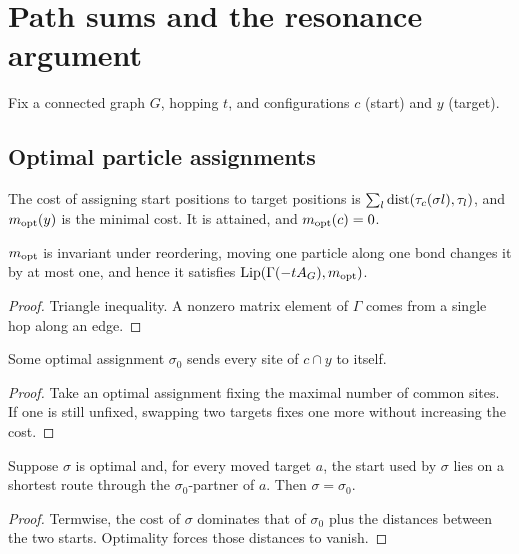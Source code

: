 \chapter{Path sums and the resonance argument}
\label{chap:pathsum}

Fix a connected graph $G$, hopping $t$, and configurations $c$ (start) and $y$ (target).

\section{Optimal particle assignments}

\begin{definition}
  \label{def:mopt}
  \leanok
  The cost of assigning start positions to target positions is $\sum_l\operatorname{dist}(\tau_c(\sigma l),\tau_l)$, and
  $m_{\mathrm{opt}}(y)$ is the minimal cost. It is attained, and $m_{\mathrm{opt}}(c)=0$.
\end{definition}

\begin{theorem}
  \label{thm:lip_mopt}
  \leanok
  $m_{\mathrm{opt}}$ is invariant under reordering, moving one particle along one bond changes it by at most one, and
  hence it satisfies $\mathrm{Lip}(\Gamma(-tA_G),m_{\mathrm{opt}})$.
\end{theorem}
\begin{proof}
  \leanok
  Triangle inequality. A nonzero matrix element of $\Gamma$ comes from a single hop along an edge.
\end{proof}

\begin{theorem}
  \label{thm:exists_opt_fixing}
  \leanok
  Some optimal assignment $\sigma_0$ sends every site of $c\cap y$ to itself.
\end{theorem}
\begin{proof}
  \leanok
  Take an optimal assignment fixing the maximal number of common sites. If one is still unfixed, swapping
  two targets fixes one more without increasing the cost.
\end{proof}

\begin{theorem}
  \label{thm:opt_unique_of_through}
  \leanok
  Suppose $\sigma$ is optimal and, for every moved target $a$, the start used by $\sigma$ lies on a shortest
  route through the $\sigma_0$-partner of $a$. Then $\sigma=\sigma_0$.
\end{theorem}
\begin{proof}
  \leanok
  Termwise, the cost of $\sigma$ dominates that of $\sigma_0$ plus the distances between the two starts.
  Optimality forces those distances to vanish.
\end{proof}

